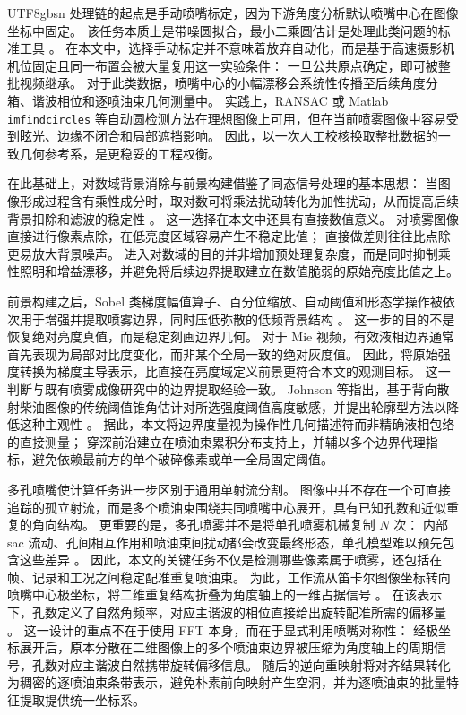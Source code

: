 \documentclass[english, 12pt, a4paper, elec, utf8, a-2b, online]{aaltothesis}
\begin{document}
\begin{CJK*}{UTF8}{gbsn}
处理链的起点是手动喷嘴标定，因为下游角度分析默认喷嘴中心在图像坐标中固定。
该任务本质上是带噪圆拟合，最小二乘圆估计是处理此类问题的标准工具 \cite{Pratt1987CircleFit,Taubin1991CircleFit}。
在本文中，选择手动标定并不意味着放弃自动化，而是基于高速摄影机机位固定且同一布置会被大量复用这一实验条件：
一旦公共原点确定，即可被整批视频继承。
对于此类数据，喷嘴中心的小幅漂移会系统性传播至后续角度分箱、谐波相位和逐喷油束几何测量中。
实践上，RANSAC 或 Matlab \texttt{imfindcircles} 等自动圆检测方法在理想图像上可用，但在当前喷雾图像中容易受到眩光、边缘不闭合和局部遮挡影响。
因此，以一次人工校核换取整批数据的一致几何参考系，是更稳妥的工程权衡。

在此基础上，对数域背景消除与前景构建借鉴了同态信号处理的基本思想：
当图像形成过程含有乘性成分时，取对数可将乘法扰动转化为加性扰动，从而提高后续背景扣除和滤波的稳定性 \cite{OppenheimSchaferStockham1968,GonzalezWoodsDIP}。
这一选择在本文中还具有直接数值意义。
对喷雾图像直接进行像素点除，在低亮度区域容易产生不稳定比值；
直接做差则往往比点除更易放大背景噪声。
进入对数域的目的并非增加预处理复杂度，而是同时抑制乘性照明和增益漂移，并避免将后续边界提取建立在数值脆弱的原始亮度比值之上。

前景构建之后，Sobel 类梯度幅值算子、百分位缩放、自动阈值和形态学操作被依次用于增强并提取喷雾边界，同时压低弥散的低频背景结构 \cite{GonzalezWoodsDIP,Szeliski2010Vision,ZackRogersLatt1977}。
这一步的目的不是恢复绝对亮度真值，而是稳定刻画边界几何。
对于 Mie 视频，有效液相边界通常首先表现为局部对比度变化，而非某个全局一致的绝对灰度值。
因此，将原始强度转换为梯度主导表示，比直接在亮度域定义前景更符合本文的观测目标。
这一判断与既有喷雾成像研究中的边界提取经验一致。
Johnson 等指出，基于背向散射柴油图像的传统阈值锥角估计对所选强度阈值高度敏感，并提出轮廓型方法以降低这种主观性 \cite{JohnsonNaberLee2012}。
据此，本文将边界度量视为操作性几何描述符而非精确液相包络的直接测量；
穿深前沿建立在喷油束累积分布支持上，并辅以多个边界代理指标，避免依赖最前方的单个破碎像素或单一全局固定阈值。

多孔喷嘴使计算任务进一步区别于通用单射流分割。
图像中并不存在一个可直接追踪的孤立射流，而是多个喷油束围绕共同喷嘴中心展开，具有已知孔数和近似重复的角向结构。
更重要的是，多孔喷雾并不是将单孔喷雾机械复制 \(N\) 次：
内部 sac 流动、孔间相互作用和喷油束间扰动都会改变最终形态，单孔模型难以预先包含这些差异
\cite{JinKimKakamiNishidaOgataLuo2020,MopuriGrahnSedarskyHyvonen2024}。
因此，本文的关键任务不仅是检测哪些像素属于喷雾，还包括在帧、记录和工况之间稳定配准重复喷油束。
为此，工作流从笛卡尔图像坐标转向喷嘴中心极坐标，将二维重复结构折叠为角度轴上的一维占据信号 \cite{Szeliski2010Vision}。
在该表示下，孔数定义了自然角频率，对应主谐波的相位直接给出旋转配准所需的偏移量 \cite{CooleyTukey1965FFT}。
这一设计的重点不在于使用 FFT 本身，而在于显式利用喷嘴对称性：
经极坐标展开后，原本分散在二维图像上的多个喷油束边界被压缩为角度轴上的周期信号，孔数对应主谐波自然携带旋转偏移信息。
随后的逆向重映射将对齐结果转化为稠密的逐喷油束条带表示，避免朴素前向映射产生空洞，并为逐喷油束的批量特征提取提供统一坐标系。


\end{CJK*}
\end{document}
